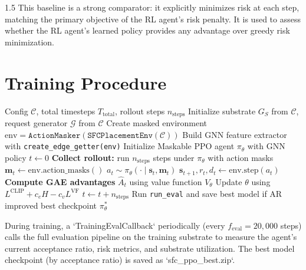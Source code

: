 \documentclass[A4paper,12pt]{report}
\theoremstyle{plain}
\theoremstyle{definition}
\theoremstyle{remark}
\numberwithin{equation}{section}
\begin{document}
\begin{spacing}{1.5}
This baseline is a strong comparator: it explicitly minimizes risk at each step, matching the primary objective of the RL agent's risk penalty. It is used to assess whether the RL agent's learned policy provides any advantage over greedy risk minimization.

\section{Training Procedure}

\begin{algorithm}[!ht]
\caption{Training Procedure for Maskable PPO with GNN}
\label{alg:training}
\begin{algorithmic}[1]
\Require Config $\mathcal{C}$, total timesteps $T_{\text{total}}$, rollout steps $n_{\text{steps}}$
\State Initialize substrate $G_S$ from $\mathcal{C}$, request generator $\mathcal{G}$ from $\mathcal{C}$
\State Create masked environment $\text{env} = \texttt{ActionMasker}(\texttt{SFCPlacementEnv}(\mathcal{C}))$
\State Build GNN feature extractor with \texttt{create\_edge\_getter(env)}
\State Initialize Maskable PPO agent $\pi_\theta$ with GNN policy
\State $t \leftarrow 0$
  \State \textbf{Collect rollout:} run $n_{\text{steps}}$ steps under $\pi_\theta$ with action masks
    \State $\mathbf{m}_t \leftarrow \text{env.action\_masks}()$
    \State $a_t \sim \pi_\theta(\cdot \mid \mathbf{s}_t, \mathbf{m}_t)$
    \State $\mathbf{s}_{t+1}, r_t, d_t \leftarrow \text{env.step}(a_t)$
  \EndFor
  \State \textbf{Compute GAE advantages} $\hat{A}_t$ using value function $V_\theta$
      \State Update $\theta$ using $L^{\text{CLIP}} + c_e H - c_v L^{\text{VF}}$
    \EndFor
  \EndFor
  \State $t \leftarrow t + n_{\text{steps}}$
    \State Run \texttt{run\_eval} and save best model if AR improved
  \EndIf
\EndWhile
\State \Return best checkpoint $\pi_\theta^*$
\end{algorithmic}
\end{algorithm}

During training, a `TrainingEvalCallback` periodically (every $f_{\text{eval}} = 20,000$ steps) calls the full evaluation pipeline on the training substrate to measure the agent's current acceptance ratio, risk metrics, and substrate utilization. The best model checkpoint (by acceptance ratio) is saved as `sfc\_ppo\_best.zip`.


\end{spacing}
\end{document}
